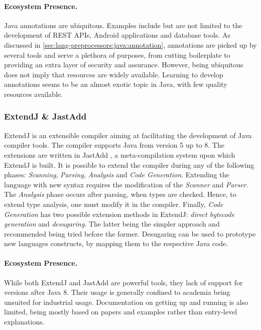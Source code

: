 \paragraph{Ecosystem Presence.}
Java annotations are ubiquitous.
Examples include but are not limited to the development of REST APIs,
Android applications and database tools.
As discussed in \autoref{sec:lang-preprocessors:java:annotation},
annotations are picked up by several tools and serve a plethora of purposes,
from cutting boilerplate to providing an extra layer of security and assurance.
However, being ubiquitous does not imply that resources are widely available.
Learning to develop annotations seems to be an almost exotic topic in Java,
with few quality resources available.

\subsubsection*{ExtendJ \& JastAdd}\label{sec:lang-preprocessors:java:extendj}

ExtendJ is an extensible compiler aiming at facilitating the development of Java compiler tools.
The compiler supports Java from version 5 up to 8.
The extensions are written in JastAdd \autocite{JastAdd2021}, a meta-compilation system upon which ExtendJ is built.
It is possible to extend the compiler during any of the following phases: \emph{Scanning}, \emph{Parsing}, \emph{Analysis} and \emph{Code Generation}.
Extending the language with new syntax requires the modification of the \emph{Scanner} and \emph{Parser}.
The \emph{Analysis} phase occurs after parsing, when types are checked.
Hence, to extend type analysis, one must modify it in the compiler.
Finally, \emph{Code Generation} has two possible extension methods in ExtendJ:
\emph{direct bytecode generation} and \emph{desugaring}.
The latter being the simpler approach and recommended being tried before the former.
Desugaring can be used to prototype new languages constructs, by mapping them to the respective Java code.

\paragraph{Ecosystem Presence.}
While both ExtendJ and JastAdd are powerful tools, they lack of support for versions after Java 8.
Their usage is generally confined to academia being unsuited for industrial usage.
Documentation on getting up and running is also limited,
being mostly based on papers and examples rather than entry-level explanations.

